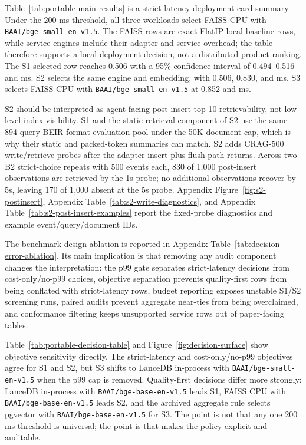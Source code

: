 

Table~\ref{tab:portable-main-results} is a strict-latency deployment-card summary. Under the 200 ms \maxrowp threshold, all three workloads select FAISS CPU with \texttt{BAAI/bge-small-en-v1.5}. The FAISS rows are exact FlatIP local-baseline rows, while service engines include their adapter and service overhead; the table therefore supports a local deployment decision, not a distributed product ranking. The S1 selected row reaches \ndcg{} 0.506 with a 95\% confidence interval of 0.494--0.516 and  ms. S2 selects the same engine and embedding, with \ndcg{} 0.506, \postinsertfive{} 0.830, and  ms. S3 selects FAISS CPU with \texttt{BAAI/bge-small-en-v1.5} at \ecov{} 0.852 and  ms.

S2 should be interpreted as agent-facing post-insert top-10 retrievability, not low-level index visibility. S1 and the static-retrieval component of S2 use the same 894-query BEIR-format evaluation pool under the 50K-document cap, which is why their static \ndcg{} and packed-token summaries can match. S2 adds CRAG-500 write/retrieve probes after the adapter insert-plus-flush path returns. Across two B2 strict-choice repeats with 500 events each, 830 of 1{,}000 post-insert observations are retrieved by the 1s probe; no additional observations recover by 5s, leaving 170 of 1{,}000 absent at the 5s probe. Appendix Figure~\ref{fig:s2-postinsert}, Appendix Table~\ref{tab:s2-write-diagnostics}, and Appendix Table~\ref{tab:s2-post-insert-examples} report the fixed-probe diagnostics and example event/query/document IDs.

The benchmark-design ablation is reported in Appendix Table~\ref{tab:decision-error-ablation}. Its main implication is that removing any audit component changes the interpretation: the p99 gate separates strict-latency decisions from cost-only/no-p99 choices, objective separation prevents quality-first rows from being conflated with strict-latency rows, budget reporting exposes unstable S1/S2 screening runs, paired audits prevent aggregate near-ties from being overclaimed, and conformance filtering keeps unsupported service rows out of paper-facing tables.



Table~\ref{tab:portable-decision-table} and Figure~\ref{fig:decision-surface} show objective sensitivity directly. The strict-latency and cost-only/no-p99 objectives agree for S1 and S2, but S3 shifts to LanceDB in-process with \texttt{BAAI/bge-small-en-v1.5} when the p99 cap is removed. Quality-first decisions differ more strongly: LanceDB in-process with \texttt{BAAI/bge-base-en-v1.5} leads S1, FAISS CPU with \texttt{BAAI/bge-base-en-v1.5} leads S2, and the archived aggregate rule selects pgvector with \texttt{BAAI/bge-base-en-v1.5} for S3. The point is not that any one 200 ms threshold is universal; the point is that \sys makes the policy explicit and auditable.

